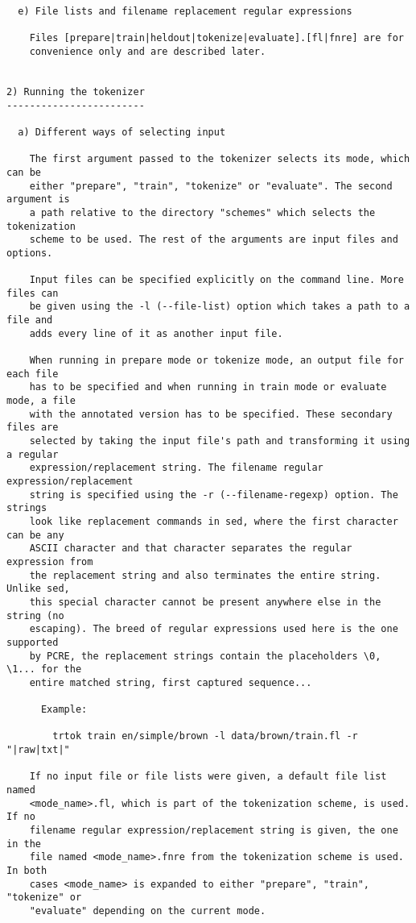\begin{tiny}
\begin{verbatim}
  e) File lists and filename replacement regular expressions

    Files [prepare|train|heldout|tokenize|evaluate].[fl|fnre] are for
    convenience only and are described later.
 

2) Running the tokenizer
------------------------

  a) Different ways of selecting input

    The first argument passed to the tokenizer selects its mode, which can be
    either "prepare", "train", "tokenize" or "evaluate". The second argument is
    a path relative to the directory "schemes" which selects the tokenization
    scheme to be used. The rest of the arguments are input files and options.

    Input files can be specified explicitly on the command line. More files can
    be given using the -l (--file-list) option which takes a path to a file and
    adds every line of it as another input file.

    When running in prepare mode or tokenize mode, an output file for each file
    has to be specified and when running in train mode or evaluate mode, a file
    with the annotated version has to be specified. These secondary files are
    selected by taking the input file's path and transforming it using a regular
    expression/replacement string. The filename regular expression/replacement
    string is specified using the -r (--filename-regexp) option. The strings
    look like replacement commands in sed, where the first character can be any
    ASCII character and that character separates the regular expression from
    the replacement string and also terminates the entire string. Unlike sed,
    this special character cannot be present anywhere else in the string (no
    escaping). The breed of regular expressions used here is the one supported
    by PCRE, the replacement strings contain the placeholders \0, \1... for the
    entire matched string, first captured sequence...
      
      Example:

        trtok train en/simple/brown -l data/brown/train.fl -r "|raw|txt|"

    If no input file or file lists were given, a default file list named
    <mode_name>.fl, which is part of the tokenization scheme, is used. If no
    filename regular expression/replacement string is given, the one in the
    file named <mode_name>.fnre from the tokenization scheme is used. In both
    cases <mode_name> is expanded to either "prepare", "train", "tokenize" or
    "evaluate" depending on the current mode.


\end{verbatim}
\end{tiny}
